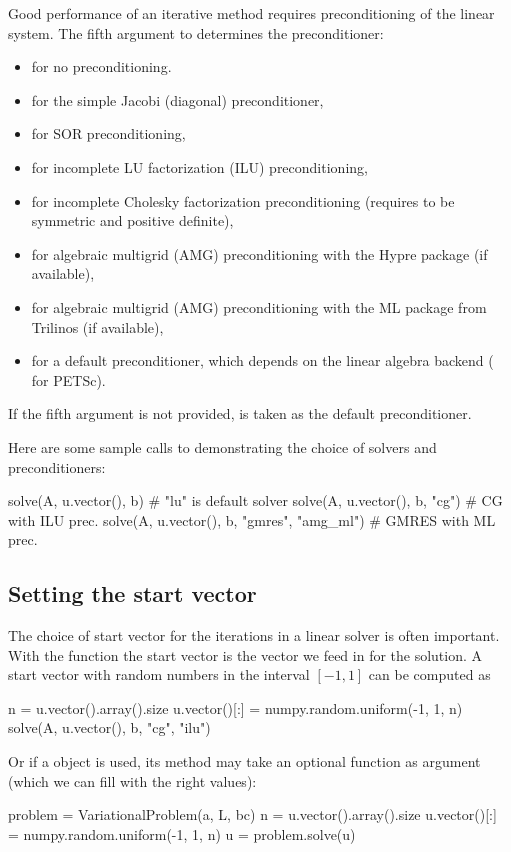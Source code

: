 Good performance of an iterative method requires preconditioning of
the linear system. The fifth argument to  determines the
preconditioner:
\begin{itemize}
\item {} for no preconditioning.
\item {} for the simple Jacobi (diagonal) preconditioner,
\item {} for SOR preconditioning,
\item {} for incomplete LU factorization (ILU) preconditioning,
\item {} for incomplete Cholesky factorization preconditioning
(requires  to be symmetric and positive definite),
\item {} for algebraic multigrid (AMG) preconditioning
with the Hypre package (if available),
\item {} for algebraic multigrid (AMG) preconditioning
with the ML package from Trilinos (if available),
\item {} for a default preconditioner, which depends
on the linear algebra backend ( for PETSc).
\end{itemize}
If the fifth argument is not provided,  is taken as the default
preconditioner.

Here are some sample calls to  demonstrating the choice of
solvers and preconditioners:
\begin{python}
solve(A, u.vector(), b)         # "lu" is default solver
solve(A, u.vector(), b, "cg")   # CG with ILU prec.
solve(A, u.vector(), b, "gmres", "amg_ml")  # GMRES with ML prec.
\end{python}

\subsection{Setting the start vector}

The choice of start vector for the iterations in a linear solver is often
important. With the  function the start vector
is the vector we feed in for the solution. A start vector
with random numbers in the interval $[-1,1]$ can be computed as
\begin{python}
n = u.vector().array().size
u.vector()[:] = numpy.random.uniform(-1, 1, n)
solve(A, u.vector(), b, "cg", "ilu")
\end{python}
Or if a  object is used, its 
method may take an optional  function as argument (which we
can fill with the right values):
\begin{python}
problem = VariationalProblem(a, L, bc)
n = u.vector().array().size
u.vector()[:] = numpy.random.uniform(-1, 1, n)
u = problem.solve(u)
\end{python}

